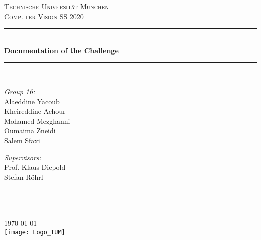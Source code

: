 \begin{titlepage}
    \newcommand{\HRule}{\rule{\linewidth}{0.5mm}}

    \center

    \textsc{\LARGE Technische Universität München}\\[1.5cm]
    \textsc{\Large Computer Vision SS 2020}\\[0.5cm]

    \HRule \\[0.7cm]
    { \huge \bfseries Documentation of the Challenge}\\[0.4cm]
    \HRule \\[1.5cm]

    \begin{minipage}{0.3\textwidth}
    \raggedright
    \emph{Group 16:}\\
    Alaeddine Yacoub\\
    Kheireddine Achour\\
    Mohamed Mezghanni\\
    Oumaima Zneidi \\
    Salem Sfaxi
    \end{minipage}
	\hspace{2cm}
    \begin{minipage}{0.3\textwidth}
	\raggedright
    \emph{Supervisors:}\\
    Prof. Klaus Diepold\\
    Stefan Röhrl \\
    ~\\
    ~
    \end{minipage}\\[4cm]

    {\large \today}\\[3cm]

    \texttt{[image: Logo\_TUM]}
\end{titlepage}
